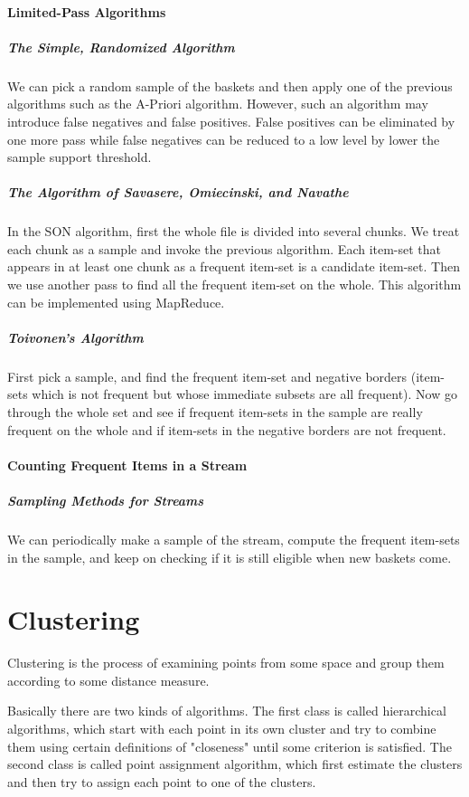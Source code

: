 \documentclass{article}
\begin{document}
\paragraph{Limited-Pass Algorithms}
\subparagraph{The Simple, Randomized Algorithm}
We can pick a random sample of the baskets and then apply one of the previous algorithms such as the A-Priori algorithm. However, such an algorithm may introduce false negatives and false positives. False positives can be eliminated by one more pass while false negatives can be reduced to a low level by lower the sample support threshold.

\subparagraph{The Algorithm of Savasere, Omiecinski, and Navathe}
In the SON algorithm, first the whole file is divided into several chunks. We treat each chunk as a sample and invoke the previous algorithm. Each item-set that appears in at least one chunk as a frequent item-set is a candidate item-set. Then we use another pass to find all the frequent item-set on the whole. This algorithm can be implemented using MapReduce.

\subparagraph{Toivonen’s Algorithm}
First pick a sample, and find the frequent item-set and negative borders (item-sets which is not frequent but whose immediate subsets are all frequent). Now go through the whole set and see if frequent item-sets in the sample are really frequent on the whole and if item-sets in the negative borders are not frequent.

\paragraph{Counting Frequent Items in a Stream}
\subparagraph{Sampling Methods for Streams}
We can periodically make a sample of the stream, compute the frequent item-sets in the sample, and keep on checking if it is still eligible when new baskets come.

\section*{Clustering}
Clustering is the process of examining points from some space and group them according to some distance measure.

Basically there are two kinds of algorithms. The first class is called hierarchical algorithms, which start with each point in its own cluster and try to combine them using certain definitions of "closeness" until some criterion is satisfied. The second class is called point assignment algorithm, which first estimate the clusters and then try to assign each point to one of the clusters.
\end{document}

